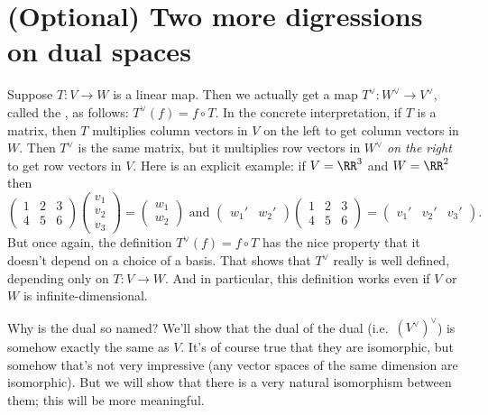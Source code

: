 \section{(Optional) Two more digressions on dual spaces}
\begin{itemize}
	\ii Suppose $T : V \to W$ is a linear map.
	Then we actually get a map $T^\vee : W^\vee \to V^\vee$,
	called the , as follows:
	$T^\vee(f) = f \circ T$.
	In the concrete interpretation, if $T$ is a matrix, then
	$T$ multiplies column vectors in $V$ on the left to get column vectors in $W$.
	Then $T^\vee$ is the same matrix, but it multiplies
	row vectors in $W^\vee$ \emph{on the right} to get row vectors in $V$.
	Here is an explicit example: if $V = \RR^3$ and $W = \RR^2$ then
	\[
		\left(
		\begin{array}{ccc}
			1 & 2 & 3 \\
			4 & 5 & 6
		\end{array}
		\right)
		\left(
		\begin{array}{c}
			v_1 \\ v_2 \\ v_3 
		\end{array}
		\right)
		= \left(
		\begin{array}{c}
			w_1 \\ w_2
		\end{array}
		\right) 
		\text{ and }
		\left(
		\begin{array}{cc}
			w_1' & w_2'
		\end{array}
		\right)
		\left(
		\begin{array}{ccc}
			1 & 2 & 3 \\
			4 & 5 & 6
		\end{array}
		\right)
		=
		\left(
		\begin{array}{ccc}
			v_1' & v_2' & v_3'
		\end{array}
		\right).
	\]
	But once again, the definition $T^\vee(f) = f \circ T$
	has the nice property that it doesn't depend on a choice of a basis.
	That shows that $T^\vee$ really is well defined, depending only on $T : V \to W$.
	And in particular, this definition works even if $V$ or $W$
	is infinite-dimensional.

	\ii Why is the dual so named?
	We'll show that the dual of the dual (i.e.\ $(V^\vee)^\vee$)
	is somehow exactly the same as $V$.
	It's of course true that they are isomorphic, but somehow that's
	not very impressive (any vector spaces of the same dimension are isomorphic).
	But we will show that there is a very natural isomorphism between them;
	this will be more meaningful.


\end{itemize}
